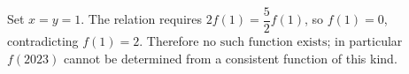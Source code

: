 Set $x=y=1$. The relation requires $2f(1)=\dfrac{5}{2}f(1)$, so $f(1)=0$, contradicting $f(1)=2$. Therefore $\boxed{\text{no such function exists}}$; in particular $f(2023)$ cannot be determined from a consistent function of this kind.
